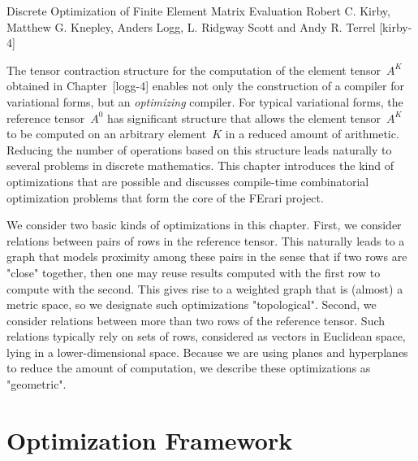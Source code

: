               {Discrete Optimization of Finite Element Matrix Evaluation}
              {Robert C. Kirby, Matthew G. Knepley, Anders Logg, L. Ridgway Scott and Andy R. Terrel}
              {[kirby-4]}

\vspace{-0.5cm}

The tensor contraction structure for the computation of the element
tensor~$A^K$ obtained in Chapter~[logg-4] enables not only the
construction of a compiler for variational forms, but an
\emph{optimizing} compiler. For typical variational forms, the
reference tensor~$A^0$ has significant structure that allows the
element tensor~$A^K$ to be computed on an arbitrary element~$K$ in a
reduced amount of arithmetic. Reducing the number of operations based
on this structure leads naturally to several problems in discrete
mathematics.  This chapter introduces the kind of optimizations that
are possible and discusses compile-time combinatorial optimization
problems that form the core of the FErari
project.~\cite{KirbyLoggEtAl2006,KirbyScott2007,KirbyLogg2008,www:ferari}

We consider two basic kinds of optimizations in this chapter. First,
we consider relations between pairs of rows in the reference tensor.
This naturally leads to a graph that models proximity among these
pairs in the sense that if two rows are "close" together, then one may
reuse results computed with the first row to compute with the second.
This gives rise to a weighted graph that is (almost) a metric space,
so we designate such optimizations "topological". Second, we consider
relations between more than two rows of the reference tensor. Such
relations typically rely on sets of rows, considered as vectors in
Euclidean space, lying in a lower-dimensional space. Because we are
using planes and hyperplanes to reduce the amount of computation, we
describe these optimizations as "geometric".

\section{Optimization Framework}

